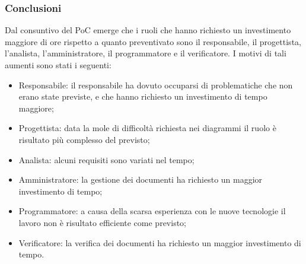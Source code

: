 \subsubsection{Conclusioni}
Dal consuntivo del PoC emerge che i ruoli che hanno richiesto un investimento maggiore di ore rispetto a quanto preventivato sono il responsabile, il progettista, l'analista, l'amministratore, il programmatore e il verificatore. I motivi di tali aumenti sono stati i seguenti:
\begin{itemize}
    \item Responsabile: il responsabile ha dovuto occuparsi di problematiche che non erano state previste, e che hanno richiesto un investimento di tempo maggiore;
    \item Progettista: data la mole di difficoltà richiesta nei diagrammi il ruolo è risultato più complesso del previsto;
    \item Analista: alcuni requisiti sono variati nel tempo;
    \item Amministratore: la gestione dei documenti ha richiesto un maggior investimento di tempo;
    \item Programmatore: a causa della scarsa esperienza con le nuove tecnologie il lavoro non è risultato efficiente come previsto;
    \item Verificatore: la verifica dei documenti ha richiesto un maggior investimento di tempo.
\end{itemize}